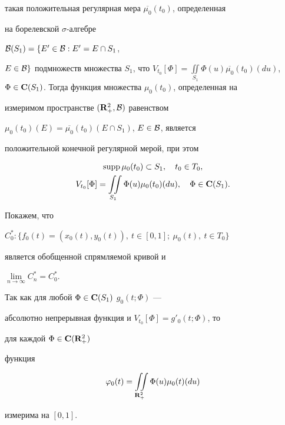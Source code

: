\begin{pf}
такая положительная регулярная мера $\overline {\mu_0}(t_0)$, определенная


на борелевской $\sigma$-алгебре


${\cal B} (S_1)=\{E'\in {\cal B} : E'=E\cap S_1$,


$E\in {\cal B} \}$ подмножеств множества $S_1$, что $V_{t_0}[\Phi]=


\iint\limits_{S_1} \Phi(u) \overline {\mu_0}(t_0)(du)$, $\Phi\in


{\bold{C}}(S_1)$. Тогда функция множества $\mu_0(t_0)$, определенная на


измеримом пространстве $({\bold R}^2_+, {\cal B})$ равенством


$\mu_0(t_0)(E)= \overline {\mu_0}(t_0)(E\cap S_1)$, $E\in {\cal B}$, является


положительной конечной регулярной мерой, при этом


\begin{gather}


\supp\mu_0(t_0) \subset S_1,\quad t_0\in T_0,\\


%


V_{t_0}[\Phi]= \iint\limits_{S_1}


\Phi(u)\mu_0(t_0)(du),\quad \Phi\in {\bold{C}}(S_1).


\end{gather}


Покажем, что


$C^*_0:\{f_0(t)=(x_0(t),y_0(t)),\ t\in [0,1];\ \mu_0(t),\ t\in T_0\}$


является обобщенной спрямляемой кривой и


$\lim\limits_{n\to \infty }C^*_n=C^*_0$.





Так как для любой $\Phi\in {\bold{C}}(S_1)$\; $g_0 (t;\Phi)$ ---


абсолютно непрерывная функция и $V_{t_0}[\Phi]=g'_0 (t;\Phi)$, то


для каждой $\Phi\in {\bold{C}}({\bold R}^2_+)$


функция


\begin{equation}


\varphi_0(t)= \iint\limits_{{\bold R}^2_+} \Phi(u)\mu_0(t)(du)


\end{equation}


измерима на $[0,1]$.



\end{pf}
